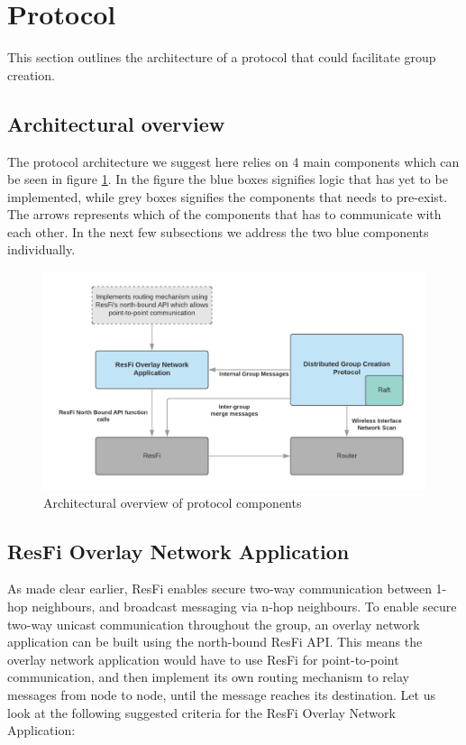\section{Protocol}
This section outlines the architecture of a protocol that could facilitate group creation.

\subsection{Architectural overview}
The protocol architecture we suggest here relies on 4 main components which can be seen in figure \ref{fig:dgcpoverview}.
In the figure the blue boxes signifies logic that has yet to be implemented, while grey boxes signifies the components that needs to pre-exist. The arrows
represents which of the components that has to communicate with each other. In the next few subsections we address the two blue components individually.


\begin{figure}
	\includegraphics[width=\textwidth]{Images/dgcpoverview.png}
		\caption{Architectural overview of protocol components }%
		\label{fig:dgcpoverview}%
\end{figure}


\subsection{ResFi Overlay Network Application}
As made clear earlier, ResFi enables secure two-way communication between 1-hop neighbours, and broadcast messaging via n-hop neighbours. 
To enable secure two-way unicast communication throughout the group, an overlay network application can be built using the north-bound ResFi API. 
This means the overlay network application would have to use ResFi for point-to-point communication, and then implement its own routing mechanism
to relay messages from node to node, until the message reaches its destination. Let us look at the following suggested criteria for the ResFi Overlay Network Application:

